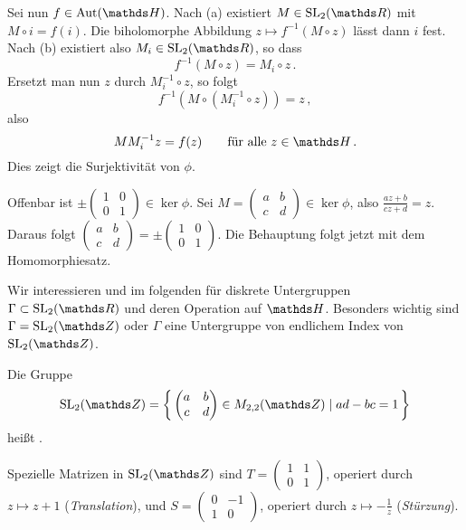 \begin{bewe-list}
Sei nun $f\in\Aut(\HH)$.
Nach (a) existiert $M\in\SL_2(\RR)$ mit $M\circ i = f(i)$.
Die biholomorphe Abbildung $z\mapsto f^{-1}(M\circ z)$ lässt dann $i$ fest.
Nach (b) existiert also $M_i \in \SL_2(\RR)$, so dass
\[
	f^{-1}(M \circ z) = M_i \circ z
	\,.
\]
Ersetzt man nun $z$ durch $M_i^{-1} \circ z$, so folgt
\[
	f^{-1}(M \circ (M_i^{-1} \circ z))
	= z
	\,,
\]
also
\[
	MM_i^{-1}z = f(z)
	\qquad \text{für alle } z \in \HH
	\,.
\]
Dies zeigt die Surjektivität von $\phi$.

Offenbar ist $\pm (\begin{smallmatrix} 1 & 0\\ 0 & 1\end{smallmatrix}) \in \ker \phi$.
Sei $M = (\begin{smallmatrix} a & b\\ c & d\end{smallmatrix}) \in \ker \phi$, also $\frac{az+b}{cz+d} = z$.
Daraus folgt $(\begin{smallmatrix} a & b\\ c & d\end{smallmatrix}) = \pm (\begin{smallmatrix} 1 & 0\\ 0 & 1\end{smallmatrix})$.
Die Behauptung folgt jetzt mit dem Homomorphiesatz.
\end{bewe-list}

Wir interessieren und im folgenden für diskrete Untergruppen $\Gamma \subset \SL_2(\RR)$ und deren Operation auf $\HH$.
Besonders wichtig sind $\Gamma = \SL_2(\ZZ)$ oder $\Gamma$ eine Untergruppe von endlichem Index von $\SL_2(\ZZ)$.

\begin{defi}
Die Gruppe 
\[
	\SL_2(\ZZ) = \Set{ \begin{pmatrix} a & b \\ c& d\end{pmatrix} \in M_{2,2}(\ZZ) \mid ad-bc = 1}
\]
heißt .

Spezielle Matrizen in $\SL_2(\ZZ)$ sind $T = (\begin{smallmatrix} 1 & 1 \\ 0 & 1\end{smallmatrix})$, operiert durch $z \mapsto z + 1$ (\emph{Translation}), und $S = (\begin{smallmatrix} 0 & -1 \\ 1 & 0\end{smallmatrix})$, operiert durch $z \mapsto -\frac{1}{z}$ (\emph{Stürzung}).
\end{defi}

